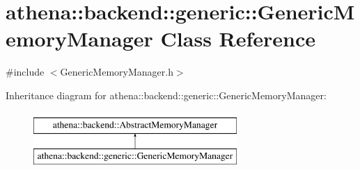 \hypertarget{classathena_1_1backend_1_1generic_1_1_generic_memory_manager}{}\section{athena\+:\+:backend\+:\+:generic\+:\+:Generic\+Memory\+Manager Class Reference}
\label{classathena_1_1backend_1_1generic_1_1_generic_memory_manager}


{\ttfamily \#include $<$Generic\+Memory\+Manager.\+h$>$}

Inheritance diagram for athena\+:\+:backend\+:\+:generic\+:\+:Generic\+Memory\+Manager\+:\begin{figure}[H]
\begin{center}
\leavevmode
\includegraphics[height=2.000000cm]{classathena_1_1backend_1_1generic_1_1_generic_memory_manager}
\end{center}
\end{figure}
